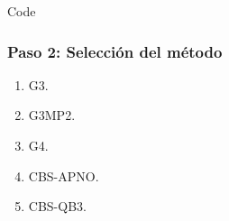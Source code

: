 \documentclass{beamer}
\begin{document}

\begin{frame}[fragile]{Code}
\frametitle{Paso 2: Selección del método}

\begin{enumerate}		
	\item G3. 
	\item G3MP2.
	\item G4.	
	\item CBS-APNO.
	\item CBS-QB3.
\end{enumerate}
\end{frame}

\end{document}
